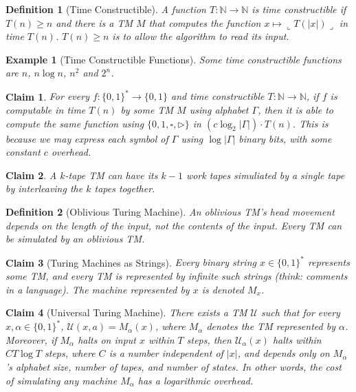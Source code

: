 \documentclass[10pt]{article}
\newtheorem{definition}{Definition}[section]
\newtheorem{claim}{Claim}[section]
\newtheorem{example}{Example}[section]
\begin{document}
\begin{definition}[Time Constructible]
  A function $T: \mathbb{N} \to \mathbb{N}$ is time constructible if
  $T(n) \geq n$ and there is a TM $M$ that computes the function
  $x \mapsto \llcorner T(|x|) \lrcorner$ in time $T(n)$.
  $T(n) \geq n$ is to allow the algorithm to read its input.
\end{definition}

\begin{example}[Time Constructible Functions]
  Some time constructible functions are $n$, $n \log n$, $n^2$ and $2^n$.
\end{example}

\begin{claim}
  For every $f : \{0, 1\}^\ast \to \{0, 1\}$ and time constructible
  $T : \mathbb{N} \to \mathbb{N}$, if $f$ is computable in time $T(n)$ by
  some TM $M$ using alphabet $\Gamma$, then it is able to compute the same
  function using $\{0, 1, \square, \triangleright\}$ in 
  $\left(c \log_2 | \Gamma| \right) \cdot T(n)$.
  This is because we may express each symbol of $\Gamma$ using
  $\log |\Gamma|$ binary bits, with some constant $c$ overhead.
\end{claim}

\begin{claim}
  A $k$-tape TM can have its $k - 1$ work tapes simuliated by a single tape by
  interleaving the $k$ tapes together.
\end{claim}

\begin{definition}[Oblivious Turing Machine]
  An oblivious TM's head movement depends on the length of the input, not
  the contents of the input.
  Every TM can be simulated by an oblivious TM.
\end{definition}

\begin{claim}[Turing Machines as Strings]
  Every binary string $x \in \{0, 1\}^\ast$ represents some TM, and every TM
  is represented by infinite such strings (think: comments in a language).
  The machine represented by $x$ is denoted $M_x$.
\end{claim}

\begin{claim}[Universal Turing Machine]
  There exists a TM $\mathcal{U}$ such that for every
  $x, \alpha \in \{0, 1\}^\ast$, $\mathcal{U}(x, a) = M_\alpha (x)$, where
  $M_\alpha$ denotes the TM represented by $\alpha$.
  Moreover, if $M_\alpha$ halts on input $x$ within $T$ steps, then
  $\mathcal{U}_\alpha (x)$ halts within $C T \log T$ steps, where $C$ is
  a number independent of $|x|$, and depends only on $M_\alpha$'s alphabet
  size, number of tapes, and number of states.
  In other words, the cost of simulating any machine $M_\alpha$ has a
  logarithmic overhead.
\end{claim}
\end{document}
